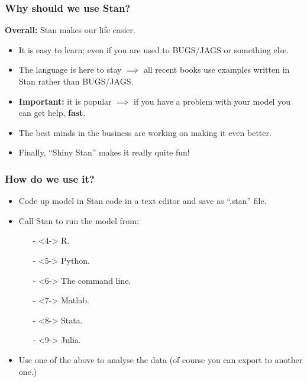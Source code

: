 \documentclass[handout]{beamer}
\begin{document}
\begin{frame}
\frametitle{Why should we use Stan?}
\textbf{Overall:} Stan makes our life easier. 

\begin{itemize}
\item<2-> It is easy to learn; even if you are used to BUGS/JAGS or something else.
\item<3-> The language is here to stay $\implies$ all recent books use examples written in Stan rather than BUGS/JAGS.
\item<4-> \textbf{Important:} it is popular $\implies$ if you have a problem with your model you can get help, \textbf{fast}.
\item<5-> The best minds in the business are working on making it even better.
\item<6-> Finally, ``Shiny Stan'' makes it really quite fun!
\end{itemize}

\end{frame}

\begin{frame}
\frametitle{How do we use it?}

\begin{itemize}
\item<2-> Code up model in Stan code in a text editor and save as ``.stan'' file.
\item<3-> Call Stan to run the model from:
\begin{itemize}
\item[-]<4-> R.
\item[-]<5-> Python.
\item[-]<6-> The command line.
\item[-]<7-> Matlab.
\item[-]<8-> Stata.
\item[-]<9-> Julia.
\end{itemize}
\item<10-> Use one of the above to analyse the data (of course you can export to another one.)
\end{itemize}
\end{frame}
\end{document}
